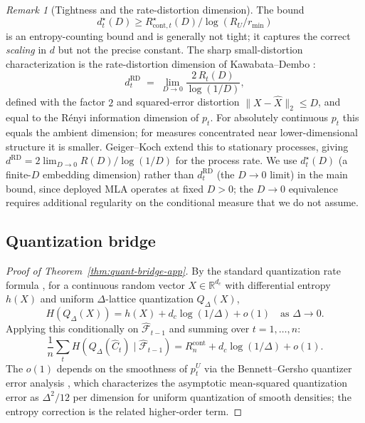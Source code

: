\documentclass[11pt]{article}
\newcommand{\R}{\mathbb{R}}
\newcommand{\F}{\mathcal{F}}
\theoremstyle{plain}
\theoremstyle{definition}
\theoremstyle{remark}
\newtheorem{remark}[theorem]{Remark}
\begin{document}
\begin{remark}[Tightness and the rate-distortion dimension]
\label{rmk:rd-OT-app}
The bound
\[
d^\star_t(D) \geq R^\star_{\mathrm{cont},t}(D) / \log(R_U/r_{\min})
\]
is an entropy-counting bound and is generally
not tight; it captures the correct \emph{scaling} in $d$ but not
the precise constant. The sharp small-distortion characterization
is the rate-distortion dimension of Kawabata--Dembo
\citep{kawabata1994rate}:
\[
d^{\mathrm{RD}}_t
\;=\;
\lim_{D \to 0} \frac{2\,R_t(D)}{\log(1/D)},
\]
defined with the factor $2$ and squared-error distortion
$\|X - \hat X\|_2 \leq D$, and equal to the R\'enyi information
dimension of $p_t$. For absolutely continuous $p_t$ this equals
the ambient dimension; for measures concentrated near
lower-dimensional structure it is smaller. Geiger--Koch
\citep{geiger2016rate} extend this to stationary processes, giving
$d^{\mathrm{RD}} = 2\lim_{D\to 0} R(D)/\log(1/D)$ for the process
rate. We use $d^\star_t(D)$ (a finite-$D$ embedding dimension)
rather than $d^{\mathrm{RD}}_t$ (the $D\to 0$ limit) in the main
bound, since deployed MLA operates at fixed $D > 0$; the
$D \to 0$ equivalence requires additional regularity on the
conditional measure that we do not assume.
\end{remark}

\subsection{Quantization bridge}\label{app:cont-quant}

\begin{proof}[Proof of Theorem~\ref{thm:quant-bridge-app}]
By the standard quantization rate formula
\citep[Theorem 8.3.1]{cover2006elements}, for a continuous random
vector $X \in \R^{d_c}$ with differential entropy $h(X)$ and
uniform $\Delta$-lattice quantization $Q_\Delta(X)$,
\[
H(Q_\Delta(X)) = h(X) + d_c \log(1/\Delta) + o(1) \quad \text{as } \Delta \to 0.
\]
Applying this conditionally on $\hat{\F}_{t-1}$ and summing over
$t = 1, \ldots, n$:
\[
\frac{1}{n}\sum_t H(Q_\Delta(\hat C_t) \mid \hat{\F}_{t-1})
= R_n^{\mathrm{cont}} + d_c \log(1/\Delta) + o(1).
\]
The $o(1)$ depends on the smoothness of $p_t^U$ via the Bennett--Gersho
quantizer error analysis \citep{gersho1979asymptotically}, which
characterizes the asymptotic mean-squared quantization error as
$\Delta^2 / 12$ per dimension for uniform quantization of smooth
densities; the entropy correction is the related higher-order term.
\end{proof}
\end{document}
